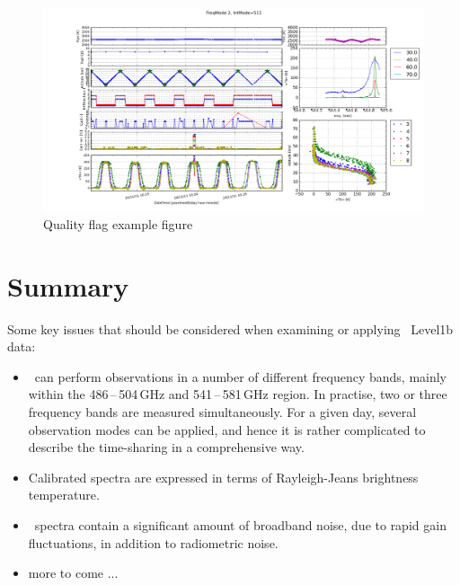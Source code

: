 \begin{figure}[t]
\includegraphics[width=14cm]{quality_control.png}
\caption{Quality flag example figure}
\label{fig:quality}
\end{figure}

    




\chapter{Summary}


Some key issues that should be considered when examining or applying \smr\
Level1b data:
\begin{itemize}

\item \smr\ can perform observations in a number of different frequency
bands, mainly within the 486\,--\,504\,GHz and 541\,--\,581\,GHz region.
In practise, two or three frequency bands are measured simultaneously.
For a given day, several observation modes can be applied, and hence
it is rather complicated to describe the time-sharing in a 
comprehensive way.
 

\item Calibrated spectra are expressed in terms of Rayleigh-Jeans brightness temperature.

\item \smr\ spectra contain a significant amount of broadband noise, 
due to rapid gain fluctuations, in addition to radiometric noise.

\item more to come ...

\end{itemize}

